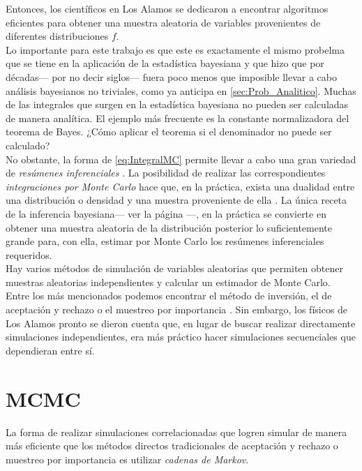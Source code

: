 Entonces, los científicos en Los Alamos se dedicaron a encontrar algoritmos eficientes para obtener una muestra aleatoria de variables provenientes de diferentes distribuciones $f$.\\ 

Lo importante para este trabajo es que este es exactamente el mismo probelma que se tiene en la aplicación de la estadística bayesiana y que hizo que por décadas--- por no decir siglos--- fuera poco menos que imposible llevar a cabo análisis bayesianos no triviales, como ya anticipa en \ref{sec:Prob_Analitico}. Muchas de las integrales que surgen en la estadística bayesiana no pueden ser calculadas de manera analítica. El ejemplo más frecuente es la constante normalizadora del teorema de Bayes. ¿Cómo aplicar el teorema si el denominador no puede ser calculado?\\ 

No obstante, la forma de \eqref{eq:IntegralMC} permite llevar a cabo una gran variedad de \textit{resúmenes inferenciales} \parencite{GP97}. La posibilidad de realizar las correspondientes \textit{integraciones por Monte Carlo} hace que, en la práctica, exista una dualidad entre una distribución o densidad y una muestra proveniente de ella \parencite{SmithGelfand92}. La única receta de la inferencia bayesiana--- ver la página \pageref{receta_bayesiana}---, en la práctica se convierte en obtener una muestra aleatoria de la distribución posterior lo suficientemente grande para, con ella, estimar por Monte Carlo los resúmenes inferenciales requeridos.\\

Hay varios métodos de simulación de variables aleatorias que permiten obtener muestras aleatorias independientes y calcular un estimador de Monte Carlo. Entre los más mencionados podemos encontrar el método de inversión, el de aceptación y rechazo o el muestreo por importancia \parencites{Ross13,RobertCasella10}. Sin embargo, los físicos de Los Alamos pronto se dieron cuenta que, en lugar de buscar realizar directamente simulaciones independientes, era más práctico hacer simulaciones secuenciales que dependieran entre sí. 

\section{MCMC}

La forma de realizar simulaciones correlacionadas que logren simular de manera más eficiente que los métodos directos tradicionales de aceptación y rechazo o muestreo por importancia es utilizar \textit{cadenas de Markov}.

